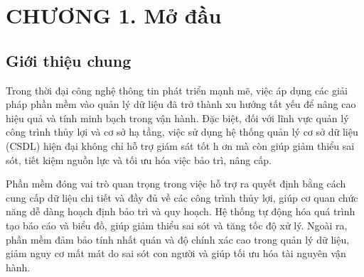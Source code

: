\documentclass{article} %
\begin{document}




\tableofcontents 
\thispagestyle{empty}
\cleardoublepage


{\let\oldnumberline\numberline
\renewcommand{\numberline}{Hình~\oldnumberline}
\listoffigures} 
\newpage

{\let\oldnumberline\numberline
\renewcommand{\numberline}{Bảng~\oldnumberline}
\listoftables}
\newpage


\newpage
\section*{CHƯƠNG 1. Mở đầu}
\setcounter{section}{1}
\setcounter{subsection}{0}
\setcounter{figure}{0}
\setcounter{table}{0}


\subsection{Giới thiệu chung}

Trong thời đại công nghệ thông tin phát triển mạnh mẽ, 
việc áp dụng các giải pháp phần mềm vào quản lý dữ liệu đã 
trở thành xu hướng tất yếu để nâng cao hiệu quả và tính minh 
bạch trong vận hành. Đặc biệt, đối với lĩnh vực quản lý công 
trình thủy lợi và cơ sở hạ tầng, việc sử dụng hệ thống quản lý cơ 
sở dữ liệu (CSDL) hiện đại không chỉ hỗ trợ giám sát tốt h
ơn mà còn giúp giảm thiểu sai sót, tiết kiệm nguồn lực 
và tối ưu hóa việc bảo trì, nâng cấp.

Phần mềm đóng vai trò quan trọng trong việc hỗ trợ ra quyết 
định bằng cách cung cấp dữ liệu chi tiết và đầy đủ về các công 
trình thủy lợi, giúp cơ quan chức năng dễ dàng hoạch định bảo trì 
và quy hoạch. Hệ thống tự động hóa quá trình tạo báo cáo và biểu đồ, 
giúp giảm thiểu sai sót và tăng tốc độ xử lý. 
Ngoài ra, phần mềm đảm bảo tính nhất quán và độ chính xác cao 
trong quản lý dữ liệu, giảm nguy cơ mất mát do sai sót con người 
và giúp tối ưu hóa tài nguyên vận hành.
\end{document}
